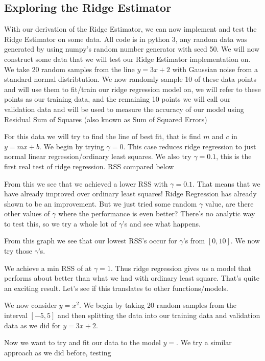 \documentclass{article}
\begin{document}
\subsection{Exploring the Ridge Estimator}

With our derivation of the Ridge Estimator, we can now implement and test the Ridge Estimator on some data.
All code is in python 3, any random data was generated by using numpy's random number generator with seed 50. We will now construct
some data that we will test our Ridge Estimator implementation on. We take 20 random samples from the line $y = 3x + 2$ with Gaussian noise from a standard
normal distribtution. We now randomly sample 10 of these data points and will use them to fit/train our ridge regression model on, we will refer to these points as our 
training data, and the remaining 10 points we will call our validation data and will be used to measure the accuracy of our model using Residual Sum of Squares (also known as Sum of Squared Errors)

For this data we will try to find the line of best fit, that is find $m$ and $c$ in $y = mx + b$. We begin by trying $\gamma = 0$. This case reduces ridge regression to 
just normal linear regression/ordinary least squares. We also try $\gamma = 0.1$, this is the first real test of ridge regression. RSS compared below

From this we see that we achieved a lower RSS with $\gamma = 0.1$. That means that we have already improved over ordinary least squares! Ridge Regression has already shown to be an improvement. 
But we just tried some random $\gamma$ value, are there other values of $\gamma$ where the performance is even better? There's no analytic way to test this,
so we try a whole lot of $\gamma$'s and see what happens.


From this graph we see that our lowest RSS's occur for $\gamma$'s from $[0,10]$. We now try those $\gamma$'s. 

We achieve a min RSS of at $\gamma = 1$. Thus ridge regression gives us a model that performs about %
better than what we had with ordinary least square. That's quite an exciting result. Let's see if this translates to other functions/models.


We now consider $y = x^2$. We begin by taking 20 random samples from the interval $[-5,5]$ and then splitting the data into our training data and validation
data as we did for $y = 3x + 2$. 

Now we want to try and fit our data to the model $y = $. We try a similar approach as we did before, testing 
\end{document}
